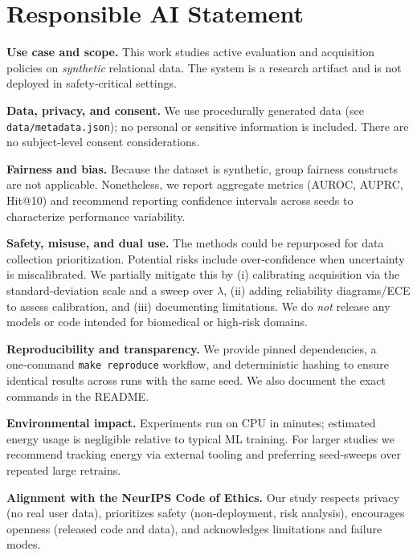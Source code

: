 \section*{Responsible AI Statement}

\textbf{Use case and scope.} This work studies active evaluation and acquisition policies on \emph{synthetic} relational data. The system is a research artifact and is not deployed in safety‑critical settings.

\textbf{Data, privacy, and consent.} We use procedurally generated data (see \texttt{data/metadata.json}); no personal or sensitive information is included. There are no subject‑level consent considerations.

\textbf{Fairness and bias.} Because the dataset is synthetic, group fairness constructs are not applicable. Nonetheless, we report aggregate metrics (AUROC, AUPRC, Hit@10) and recommend reporting confidence intervals across seeds to characterize performance variability.

\textbf{Safety, misuse, and dual use.} The methods could be repurposed for data collection prioritization. Potential risks include over‑confidence when uncertainty is miscalibrated. We partially mitigate this by (i) calibrating acquisition via the standard‑deviation scale and a sweep over $\lambda$, (ii) adding reliability diagrams/ECE to assess calibration, and (iii) documenting limitations. We do \emph{not} release any models or code intended for biomedical or high‑risk domains.

\textbf{Reproducibility and transparency.} We provide pinned dependencies, a one‑command \texttt{make reproduce} workflow, and deterministic hashing to ensure identical results across runs with the same seed. We also document the exact commands in the README.

\textbf{Environmental impact.} Experiments run on CPU in minutes; estimated energy usage is negligible relative to typical ML training. For larger studies we recommend tracking energy via external tooling and preferring seed‑sweeps over repeated large retrains.

\textbf{Alignment with the NeurIPS Code of Ethics.} Our study respects privacy (no real user data), prioritizes safety (non‑deployment, risk analysis), encourages openness (released code and data), and acknowledges limitations and failure modes.
